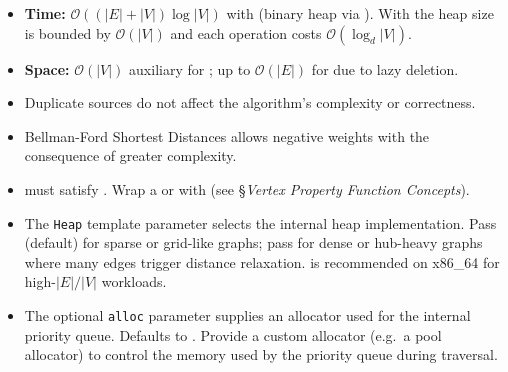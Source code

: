 \begin{itemdescr}
            \begin{itemize}
                  \item \textbf{Time:} $\mathcal{O}((|E| + |V|)\log{|V|})$ with 
                        (binary heap via ).
                        With  the heap size is bounded by $\mathcal{O}(|V|)$
                        and each operation costs $\mathcal{O}(\log_{d}{|V|})$.
                  \item \textbf{Space:} $\mathcal{O}(|V|)$ auxiliary for ;
                        up to $\mathcal{O}(|E|)$ for  due to lazy deletion.
            \end{itemize}
      \pnum\remarks 
            \begin{itemize}
                  \item Duplicate sources do not affect the algorithm's complexity or correctness.
                  \item Bellman-Ford Shortest Distances allows negative weights with the consequence of greater complexity.
                  \item {} must satisfy .  Wrap a
                         or  with 
                        (see §\textit{Vertex Property Function Concepts}).
                  \item The \lstinline{Heap} template parameter selects the internal heap implementation.
                        Pass  (default) for sparse or grid-like graphs;
                        pass  for dense or hub-heavy graphs
                        where many edges trigger distance relaxation.
                         is recommended on x86\_64 for high-$|E|/|V|$ workloads.
                  \item The optional \lstinline{alloc} parameter supplies an allocator used for
                        the internal priority queue.  Defaults to .
                        Provide a custom allocator (e.g.~a pool allocator) to control the memory
                        used by the priority queue during traversal.
            \end{itemize}
\end{itemdescr}

